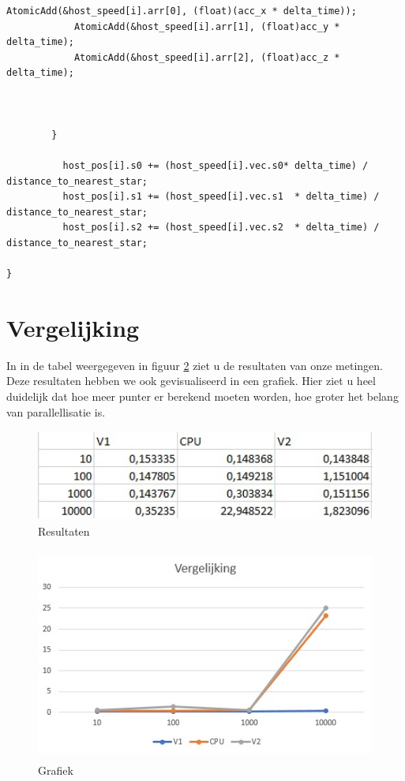 \documentclass[11pt,a4paper]{article}
\begin{document}
\begin{lstlisting}[style=CStyle]
			AtomicAdd(&host_speed[i].arr[0], (float)(acc_x * delta_time));
    		AtomicAdd(&host_speed[i].arr[1], (float)acc_y * delta_time);
    		AtomicAdd(&host_speed[i].arr[2], (float)acc_z * delta_time);



        }

      	  host_pos[i].s0 += (host_speed[i].vec.s0* delta_time) / distance_to_nearest_star;
      	  host_pos[i].s1 += (host_speed[i].vec.s1  * delta_time) / distance_to_nearest_star;
       	  host_pos[i].s2 += (host_speed[i].vec.s2  * delta_time) / distance_to_nearest_star;
   		
}
		\end{lstlisting}
		
	\section{Vergelijking}
	In in de tabel weergegeven in figuur \ref{tabel} ziet u de resultaten van onze metingen. Deze resultaten hebben we ook gevisualiseerd in een grafiek. Hier ziet u heel duidelijk dat hoe meer punter er berekend moeten worden, hoe groter het belang van parallellisatie is.
	
	\begin{figure}[htbp]
		\caption{Resultaten}
		\label{tabel}
		\centerline{\includegraphics[height=3cm]{waarden.jpg}}
	\end{figure}
	\begin{figure}[htbp]
		\caption{Grafiek}
		\label{tabel}
		\centerline{\includegraphics[height=7cm]{grafiek.jpg}}
	\end{figure}
\end{document}
